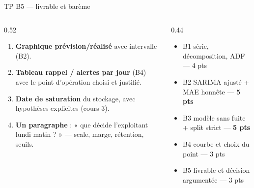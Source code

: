 \begin{frame}{TP B5 --- livrable et barème}
\begin{columns}[t]
\begin{column}{0.52\textwidth}
\begin{abox}[À rendre]
\begin{enumerate}
\item \textbf{Graphique prévision/réalisé} avec intervalle (B2).
\item \textbf{Tableau rappel / alertes par jour} (B4) avec le point
d'opération choisi et justifié.
\item \textbf{Date de saturation} du stockage, avec hypothèses
explicites (cours 3).
\item \textbf{Un paragraphe} : « que décide l'exploitant lundi matin ? »
--- scale, marge, rétention, seuils.
\end{enumerate}
\end{abox}
\end{column}
\begin{column}{0.44\textwidth}
\begin{kbox}
\begin{itemize}
\item B1 série, décomposition, ADF --- 4 pts
\item B2 SARIMA ajusté + MAE honnête --- \textbf{5 pts}
\item B3 modèle sans fuite + split strict --- \textbf{5 pts}
\item B4 courbe et choix du point --- 3 pts
\item B5 livrable et décision argumentée --- 3 pts
\end{itemize}
\end{kbox}
\end{column}
\end{columns}
\end{frame}
